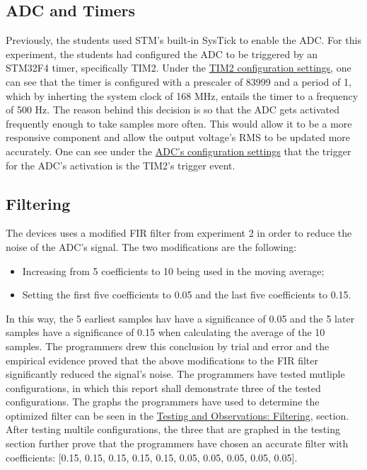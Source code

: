 \documentclass[12pt]{report}
\begin{document}
\subsection{ADC and Timers}
Previously, the students used STM's built-in SysTick to enable the ADC. For this experiment, the students had configured the ADC to be triggered by an STM32F4 timer, specifically TIM2. Under the \hyperref[appendixtim2]{TIM2 configuration settings}, one can see that the timer is configured with a prescaler of 83999 and a period of 1, which by inherting the system clock of 168 MHz, entails the timer to a frequency of 500 Hz. The reason behind this decision is so that the ADC gets activated frequently enough to take samples more often. This would allow it to be a more responsive component and allow the output voltage's RMS to be updated more accurately. One can see under the \hyperref[appendixadc]{ADC's configuration settings} that the trigger for the ADC's activation is the TIM2's trigger event.

\subsection{Filtering}
The devices uses a modified FIR filter from experiment 2 in order to reduce the noise of the ADC's signal. The two modifications are the following: 
\begin{itemize}
	\item Increasing from 5 coefficients to 10 being used in the moving average;
	\item Setting the first five coefficients to 0.05 and the last five coefficients to 0.15.
\end{itemize}
In this way, the 5 earliest samples hav have a significance of 0.05 and the 5 later samples have a significance of 0.15 when calculating the average of the 10 samples. The programmers drew this conclusion by trial and error and the empirical evidence proved that the above modifications to the FIR filter significantly reduced the signal's noise. The programmers have tested mutliple configurations, in which this report shall demonstrate three of the tested configurations. The graphs the programmers have used to determine the optimized filter can be seen in the  \hyperref[testfiltering]{Testing and Observations: Filtering}, section. After testing multile configurations, the three that are graphed in the testing section further prove that the programmers have chosen an accurate filter with coefficients: [0.15, 0.15, 0.15, 0.15, 0.15, 0.05, 0.05, 0.05, 0.05, 0.05].
\end{document}
